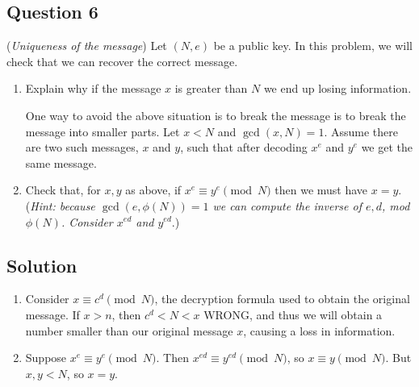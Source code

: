 \documentclass{article}
\begin{document}
\subsection*{Question 6} 
    (\textit{Uniqueness of the message}) Let $(N, e)$ be a public key. In this problem, we will check that we can recover the correct message.
    \begin{enumerate}
        \item Explain why if the message $x$ is greater than $N$ we end up losing information.
        
        \vspace{3mm} One way to avoid the above situation is to break the message is to break the message into smaller parts. Let $x < N$ and $\gcd(x, N) = 1$. Assume there are two such messages, $x$ and $y$, such that after decoding $x^{e}$ and $y^{e}$ we get the same message.
        \item Check that, for $x, y$ as above, if $x^{e} \equiv y^{e} \pmod{N}$ then we must have $x = y$. (\textit{Hint: because $\gcd(e, \phi(N)) = 1$ we can compute the inverse of $e, d$, mod $\phi(N)$. Consider $x^{ed}$ and $y^{ed}$}.)
    \end{enumerate}

\subsection*{Solution}
    \begin{enumerate}
        \item Consider $x \equiv c^{d} \pmod{N}$, the decryption formula used to obtain the original message. If $x > n$, then $c^{d} < N < x$ WRONG, and thus we will obtain a number smaller than our original message $x$, causing a loss in information.
        \item Suppose $x^{e} \equiv y^{e} \pmod{N}$. Then $x^{ed} \equiv y^{ed} \pmod{N}$, so $x \equiv y \pmod{N}$. But $x, y < N$, so $x = y$.
    \end{enumerate}
\end{document}
